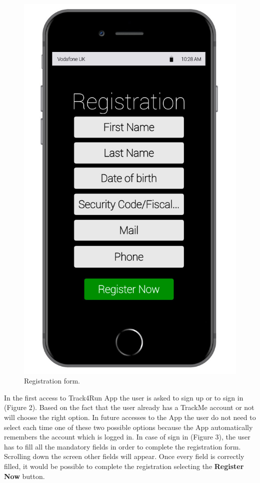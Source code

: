 \begin{enumerate}
\begin{figure}[H]
\begin{center}
\begin{minipage}[c]{.40\textwidth}
          \includegraphics[height=14 cm]{Images/Mockups/Track4RunMockup4.jpg}
	\caption{Registration form.}
        \end{minipage}
      \end{center}
\end{figure}
In the first access to Track4Run App the user is asked to sign up or to sign in 			(Figure 2). Based on the fact that the user already has a TrackMe account or not will choose the right option. In future accesses to the App the user do not need to select each time one of these two possible options because the App automatically remembers the account which is logged in. In case of sign in (Figure 3), the user has to fill all the mandatory fields in order to complete the registration form. Scrolling down the screen other fields will appear. Once every field is correctly filled, it would be possible to complete the registration selecting the \textbf{Register Now} button. 
\clearpage
\begin{figure}[H]
\begin{center}
        \begin{minipage}[c]{.40\textwidth}
        \centering

\end{minipage}
\end{center}
\end{figure}
\end{enumerate}
